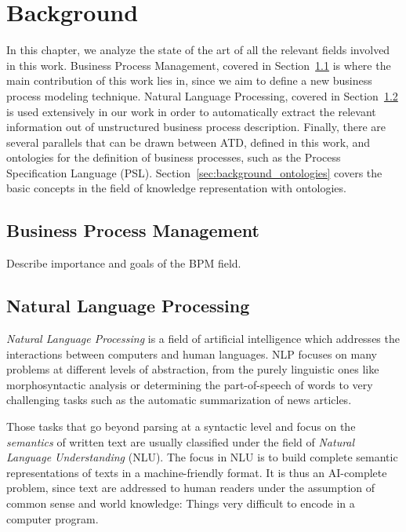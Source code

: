 \chapter{Background}
\label{cha:background}

In this chapter, we analyze the state of the art of all the relevant fields
involved in this work. Business Process Management, covered in
Section~\ref{sec:background_bpm} is where the main contribution of this work
lies in, since we aim to define a new business process modeling technique.
Natural Language Processing, covered in Section~\ref{sec:background_nlp} is used
extensively in our work in order to automatically extract the relevant
information out of unstructured business process description. Finally, there are
several parallels that can be drawn between ATD, defined in this work, and
ontologies for the definition of business processes, such as the Process
Specification Language (PSL). Section~\ref{sec:background_ontologies} covers the basic
concepts in the field of knowledge representation with ontologies.

\section{Business Process Management}
\label{sec:background_bpm}


Describe importance and goals of the BPM field.

\section{Natural Language Processing}
\label{sec:background_nlp}

\emph{Natural Language Processing} is a field of artificial intelligence which
addresses the interactions between computers and human languages. NLP focuses on
many problems at different levels of abstraction, from the purely linguistic
ones like morphosyntactic analysis or determining the part-of-speech of words
to very challenging tasks such as the automatic summarization of news articles.

Those tasks that go beyond parsing at a syntactic level and focus on the
\emph{semantics} of written text are usually classified under the field of
\emph{Natural Language Understanding} (NLU). The focus in NLU is to build
complete semantic representations of texts in a machine-friendly format. It is
thus an AI-complete\cite{22, section 1 from TFM} problem, since text are
addressed to human readers under the assumption of common sense and world
knowledge: Things very difficult to encode in a computer program. 

